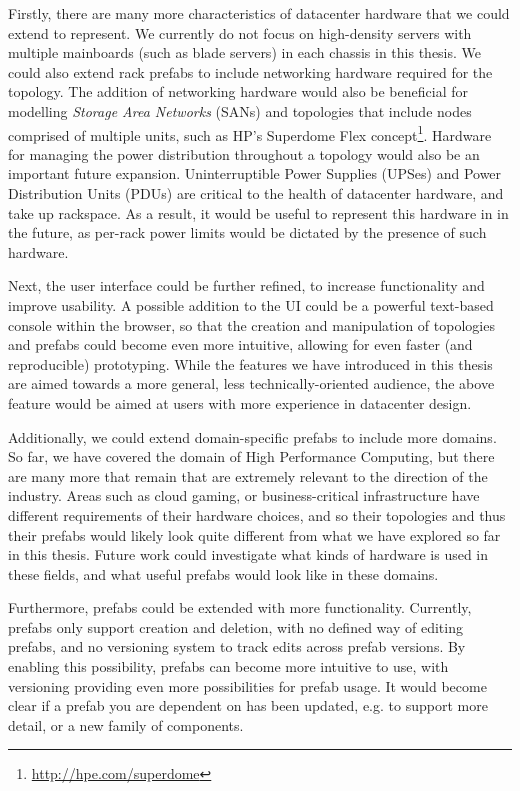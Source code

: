 \documentclass[11pt]{article}
\begin{document}
		Firstly, there are many more characteristics of datacenter hardware that we could extend \opendc{} to represent. 
		We currently do not focus on high-density servers with multiple mainboards (such as blade servers) in each chassis in this thesis. 
		We could also extend rack prefabs to include networking hardware required for the topology. 
		The addition of networking hardware would also be beneficial for modelling \textit{Storage Area Networks} (SANs) and topologies that include nodes comprised of multiple units, such as HP's Superdome Flex concept\footnote{\url{http://hpe.com/superdome}}.
		Hardware for managing the power distribution throughout a topology would also be an important future expansion.
		Uninterruptible Power Supplies (UPSes) and Power Distribution Units (PDUs) are critical to the health of datacenter hardware, and take up rackspace.
		As a result, it would be useful to represent this hardware in \opendc{} in the future, as per-rack power limits would be dictated by the presence of such hardware.

		Next, the \opendc{} user interface could be further refined, to increase functionality and improve usability.
		A possible addition to the UI could be a powerful text-based console within the browser, so that the creation and manipulation of topologies and prefabs could become even more intuitive, allowing for even faster (and reproducible) prototyping.
		While the features we have introduced in this thesis are aimed towards a more general, less technically-oriented audience, the above feature would be aimed at users with more experience in datacenter design.

		Additionally, we could extend domain-specific prefabs to include more domains.
		So far, we have covered the domain of High Performance Computing, but there are many more that remain that are extremely relevant to the direction of the industry.
		Areas such as cloud gaming, or business-critical infrastructure have different requirements of their hardware choices, and so their topologies and thus their prefabs would likely look quite different from what we have explored so far in this thesis.
		Future work could investigate what kinds of hardware is used in these fields, and what useful prefabs would look like in these domains.

		Furthermore, prefabs could be extended with more functionality.
		Currently, prefabs only support creation and deletion, with no defined way of editing prefabs, and no versioning system to track edits across prefab versions.
		By enabling this possibility, prefabs can become more intuitive to use, with versioning providing even more possibilities for prefab usage.
		It would become clear if a prefab you are dependent on has been updated, e.g. to support more detail, or a new family of components.
\end{document}
